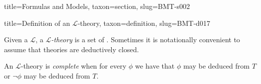 \documentclass[a4paper]{article}
\begin{document}
\begin{tree}{title={Formulas and Models}, taxon={section}, slug={BMT-s002}}
\begin{tree}{title={Definition of an \(\mathcal {L}\)-theory}, taxon={definition}, slug={BMT-d017}}

    Given a  \(\mathcal {L}\), a \emph{\(\mathcal {L}\)-theory} is a set of .
    Sometimes it is notationally convenient to assume that theories are deductively closed.
\par{
    An \(\mathcal  L\)-theory is \emph{complete} when for every  \(\phi\) we have that
    \(\phi\) may be deduced from \(T\) or \(\neg \phi\) may be deduced from \(T\).
}
\end{tree}

\end{tree}


  
  
\end{document}
